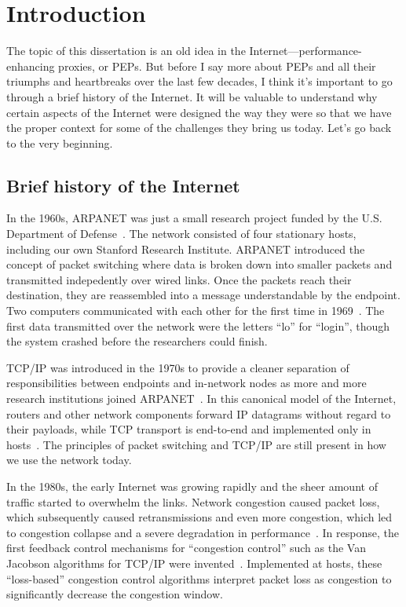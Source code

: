 \chapter{Introduction}
\label{sec:introduction}

The topic of this dissertation is an old idea in the
Internet---performance-enhancing proxies, or PEPs. But before I say more about
PEPs and all their triumphs and heartbreaks over the last few decades, I think
it's important to go through a brief history of the Internet. It will be
valuable to understand why certain aspects of the Internet were designed the
way they were so that we have the proper context for some of the challenges
they bring us today. Let's go back to the very beginning.

\section{Brief history of the Internet}

In the 1960s, ARPANET was just a small research project funded by the U.S.
Department of Defense~\cite{hauben2007history}. The network consisted of four
stationary hosts,
including our own Stanford Research Institute. ARPANET introduced the concept
of packet switching where data is broken down into smaller packets and
transmitted indepedently over wired links. Once the packets reach their
destination, they are reassembled into a message understandable by the
endpoint. Two computers communicated with each other for the first time in
1969~\cite{arpanet2019}. The first data transmitted over the network were the letters ``lo'' for
``login'', though the system crashed before the researchers could finish.

TCP/IP was introduced in the 1970s to provide a cleaner separation of
responsibilities between endpoints and in-network nodes as more and more
research institutions joined ARPANET~\cite{rfc675}. In this canonical model of
the Internet,
routers and other network components forward IP datagrams without regard to
their payloads, while TCP transport is end-to-end and implemented only in
hosts~\cite{saltzer1984endtoend,clark1988darpa}. The principles of packet
switching and TCP/IP are still present in how we use the network today.

In the 1980s, the early Internet was growing rapidly and the sheer amount of
traffic started to overwhelm the links. Network congestion caused packet loss,
which subsequently caused retransmissions and even more congestion, which led
to congestion collapse and a severe degradation in performance~\cite{rfc896}.
In response,
the first feedback control mechanisms for ``congestion control'' such as the
Van Jacobson algorithms for TCP/IP were invented~\cite{vjk}. Implemented at
hosts, these
``loss-based'' congestion control algorithms interpret packet loss as
congestion to significantly decrease the congestion window.

